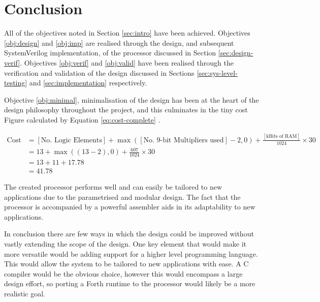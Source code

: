 \section{Conclusion}
All of the objectives noted in Section \ref{sec:intro} have been achieved. Objectives \ref{obj:design} and \ref{obj:imp} are realised through the design, and subsequent SystemVerilog implementation, of the processor discussed in Section \ref{sec:design-verif}. Objectives \ref{obj:verif} and \ref{obj:valid} have been realised through the verification and validation of the design discussed in Sections \ref{sec:sys-level-testing} and \ref{sec:implementation} respectively.

Objective \ref{obj:minimal}, minimalisation of the design has been at the heart of the design philosophy throughout the project, and this culminates in the tiny cost Figure calculated by Equation \ref{eq:cost-complete} \cite{kazmierski2017}.

\begin{align}
\text{Cost} &= [\text{No. Logic Elements}] + \max([\text{No. 9-bit Multipliers used}] -2, 0) + \frac{ [\text{kBits of RAM}]}{1024} \times 30 \nonumber \\
&= 13 +  \max((13-2), 0) + \frac{607}{1024} \times 30  \nonumber \\
&= 13 + 11 + 17.78  \nonumber \\
&= 41.78
\label{eq:cost-complete}
\end{align}

The created processor performs well and can easily be tailored to new applications due to the parametrised and modular design. The fact that the processor is accompanied by a powerful assembler aids in its adaptability to new applications.

In conclusion there are few ways in which the design could be improved without vastly extending the scope of the design. One key element that would make it more versatile would be adding support for a higher level programming language. This would allow the system to be tailored to new applications with ease. A C compiler would be the obvious choice, however this would encompass a large design effort, so porting a Forth runtime to the processor would likely be a more realistic goal.
